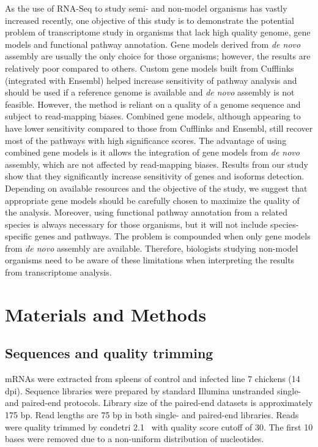 As the use of RNA-Seq to study semi- and non-model organisms
has vastly increased recently, one objective of this study
is to demonstrate the potential problem of transcriptome
study in organisms that lack high quality genome, gene
models and functional pathway annotation.  Gene models
derived from {\em de novo} assembly are usually the only
choice for those organisms; however, the results are
relatively poor compared to others.  Custom gene models
built from Cufflinks (integrated with Ensembl) helped
increase sensitivity of pathway analysis and should be used
if a reference genome is available and {\em de novo}
assembly is not feasible.  However, the method is reliant on
a quality of a genome sequence and subject to read-mapping
biases.  Combined gene models, although appearing to have
lower sensitivity compared to those from Cufflinks and
Ensembl, still recover most of the pathways with high
significance scores.  The advantage of using combined gene
models is it allows the integration of gene models from {\em
de novo} assembly, which are not affected by read-mapping
biases.  Results from our study show that they significantly
increase sensitivity of genes and isoforms
detection.  Depending on available resources and the
objective of the study, we suggest that appropriate gene
models should be carefully chosen to maximize the quality of
the analysis.  Moreover, using functional pathway annotation
from a related species is always necessary for those
organisms, but it will not include species-specific genes
and pathways. The problem is compounded when only gene
models from {\em de novo} assembly are available. Therefore,
biologists studying non-model organisms need to be aware of
these limitations when interpreting the results from
transcriptome analysis.


\section{Materials and Methods}

\subsection{Sequences and quality trimming}

mRNAs were extracted from spleens of control and infected
line 7 chickens (14 dpi).  Sequence libraries were prepared
by standard Illumina unstranded single- and paired-end
protocols.  Library size of the paired-end datasets is
approximately 175 bp.  Read lengths are 75 bp in both
single- and paired-end libraries.  Reads were quality
trimmed by condetri 2.1~\cite{smeds2011condetri} with
quality score cutoff of 30.  The first 10 bases were removed
due to a non-uniform distribution of nucleotides.

